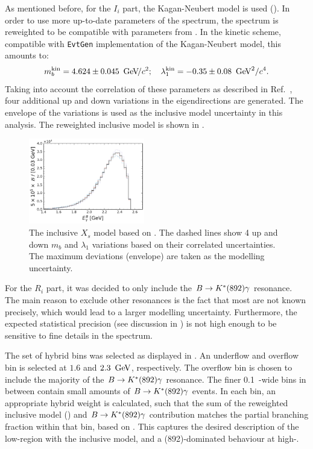 As mentioned before, for the $I_i$ part, the Kagan-Neubert model is used ().
In order to use more up-to-date parameters of the spectrum, the spectrum is reweighted to be compatible with parameters from .
In the kinetic scheme, compatible with \texttt{EvtGen} implementation of the Kagan-Neubert model, this amounts to:
\begin{equation}\label{eq:simba_result_kinetic}
    m_b^{\mathrm{kin}} =4.624 \pm 0.045~{\mathrm{\,Ge\kern -0.1em V\!/}c^2};  \quad \lambda^{\mathrm{kin}}_1 = -0.35\pm0.08~\mathrm{\,Ge\kern -0.1em V}^2/c^4.
\end{equation}
Taking into account the correlation of these parameters as described in Ref.~\cite{Bernlochner:2020jlt}, four additional up and down variations in the eigendirections are generated. 
The envelope of the variations is used as the inclusive model uncertainty in this analysis.
The reweighted inclusive model is shown in .
\begin{figure}[htbp!]
    \centering
    \includegraphics[width=0.45\textwidth]{figures/data_samples/xs_model_inclusive.pdf}
    \caption{\label{fig:inclusive_reweighted}The inclusive $X_s$ model based on .
    The dashed lines show 4 up and down $m_b$ and $\lambda_1$ variations based on their correlated uncertainties.
    The maximum deviations (envelope) are taken as the modelling uncertainty.}
\end{figure}

For the $R_i$ part, it was decided to only include the $B\rightarrow K^*(892)\gamma$ resonance.
The main reason to exclude other resonances is the fact that most are not known precisely, which would lead to a larger modelling uncertainty.
Furthermore, the expected statistical precision (see discussion in ) is not high enough to be sensitive to fine details in the spectrum.

The set of hybrid bins was selected as displayed in .
An underflow and overflow bin is selected at $1.6$ and $2.3~\mathrm{\,Ge\kern -0.1em V}$, respectively.
The overflow bin is chosen to include the majority of the $B\rightarrow K^*(892)\gamma$ resonance.
The finer 0.1~\gev-wide bins in between contain small amounts of $B\rightarrow K^*(892)\gamma$ events.
In each \EB bin, an appropriate hybrid weight is calculated, such that the sum of the reweighted inclusive model () and \mbox{$B\rightarrow K^*(892)\gamma$} contribution matches the partial branching fraction within that \EB bin, based on .
This captures the desired description of the low-\EB region with the inclusive model, and a \Kstar(892)-dominated behaviour at high-\EB.

